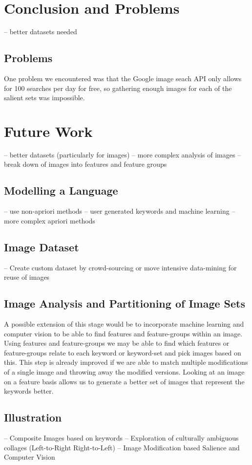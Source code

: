 \documentclass[12pt]{article}
\begin{document}
\section{Conclusion and Problems}
-- better datasets needed

\subsection{Problems}
One problem we encountered was that the Google image seach API only allows for 100 searches per day for free, so gathering enough images for each of the salient sets was impossible.

\section{Future Work}
-- better datasets (particularly for images)
-- more complex analysis of images
-- break down of images into features and feature groups

\subsection{Modelling a Language}
-- use non-apriori methods
-- user generated keywords and machine learning
-- more complex apriori methods

\subsection{Image Dataset}
-- Create custom dataset by crowd-sourcing or move intensive data-mining for reuse of images

\subsection{Image Analysis and Partitioning of Image Sets}
A possible extension of this stage would be to incorporate machine learning and computer vision to be able to find features and feature-groups within an image. Using features and feature-groups we may be able to find which features or feature-groups relate to each keyword or keyword-set and pick images based on this. This step is already improved if we are able to match multiple modifications of a single image and throwing away the modified versions. Looking at an image on a feature basis allows
us to generate a better set of images that represent the keywords better.

\subsection{Illustration}
-- Composite Images based on keywords
-- Exploration of culturally ambiguous collages (Left-to-Right Right-to-Left)
-- Image Modification based Salience and Computer Vision
\end{document}
